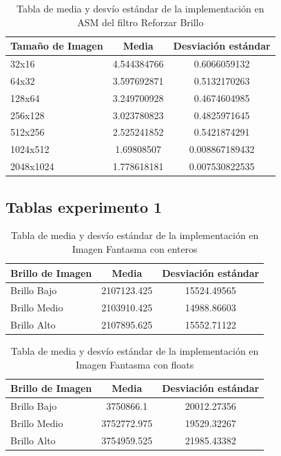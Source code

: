 \documentclass[a4paper]{article}
\begin{document}
\begin{table}[h!]
	\begin{center}
		\begin{tabular}{| l | c | c |}
			\hline
			Tamaño de Imagen & Media & Desviación estándar \\ \hline
			32x16	& 4.544384766	& 0.6066059132 \\
			64x32	& 3.597692871	 & 0.5132170263 \\
			128x64	& 3.249700928	& 0.4674604985 \\
			256x128	& 3.023780823	& 0.4825971645 \\
			512x256	& 2.525241852	& 0.5421874291 \\
			1024x512 & 1.69808507	& 0.008867189432\\ 
			2048x1024 & 1.778618181	& 0.007530822535 \\ \hline
		\end{tabular}
		\caption{Tabla de media y desvío estándar de la implementación en ASM del filtro Reforzar Brillo}
	\end{center}
\end{table}

\subsection{Tablas experimento 1}

\begin{table}[h!]
	\begin{center}
		\begin{tabular}{| l | c | c |}
			\hline
			Brillo de Imagen & Media & Desviación estándar \\ \hline
			Brillo Bajo	& 2107123.425	& 15524.49565 \\
			Brillo Medio &	2103910.425	& 14988.86603 \\
			Brillo Alto	& 2107895.625	& 15552.71122 \\ \hline
		\end{tabular}
		\caption{Tabla de media y desvío estándar de la implementación en Imagen Fantasma con enteros}
	\end{center}
\end{table}

\begin{table}[h!]
	\begin{center}
		\begin{tabular}{| l | c | c |}
			\hline
			Brillo de Imagen & Media & Desviación estándar \\ \hline
			Brillo  Bajo	& 3750866.1	& 20012.27356 \\
			Brillo Medio	& 3752772.975	& 19529.32267 \\
			Brillo Alto	& 3754959.525 &	21985.43382 \\ \hline
		\end{tabular}
		\caption{Tabla de media y desvío estándar de la implementación en Imagen Fantasma con floats}
	\end{center}
\end{table}
\end{document}
